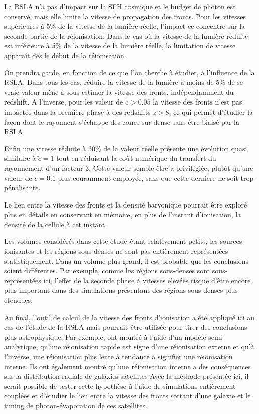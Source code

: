 La \ac{RSLA} n'a pas d'impact sur la \ac{SFH} cosmique et le budget de photon est conservé, mais elle limite la vitesse de propagation des fronts.
Pour les vitesses supérieures à 5\% de la vitesse de la lumière réelle, l'impact ce concentre sur la seconde partie de la réionisation.
Dans le cas où la vitesse de la lumière réduite est inférieure à 5\% de la vitesse de la lumière réelle, la limitation de vitesse apparaît dès le début de la réionisation. %

On prendra garde, en fonction de ce que l'on cherche à étudier, à l'influence de la \ac{RSLA}.
Dans tous les cas, réduire la vitesse de la lumière à moins de 5\% de se vraie valeur mène à sous estimer la vitesse des fronts, indépendamment du redshift.
A l'inverse, pour les valeur de $\tilde{c} > 0.05$ la vitesse des fronts n'est pas impactée dans la première phase à des redshifts $z>8$, ce qui permet d'étudier la façon dont le rayonnent s’échappe des zones sur-dense sans être biaisé par la \ac{RSLA}.

Enfin une vitesse réduite à 30\% de la valeur réelle présente une évolution quasi similaire à $\tilde{c}=1$ tout en réduisant la coût numérique du transfert du rayonnement d'un facteur 3.
Cette valeur semble être à privilégiée, plutôt qu'une valeur de $\tilde{c}=0.1$ plus couramment employée, sans que cette dernière ne soit trop pénalisante.

Le lien entre la vitesse des fronts et la densité baryonique pourrait être exploré plus en détails en conservant en mémoire, en plus de l'instant d'ionisation, la densité de la cellule à cet instant.

Les volumes considérés dans cette étude étant relativement petits, les sources ionisantes et les régions sous-denses ne sont pas entièrement représentées statistiquement.
Dans un volume plus grand, il est probable que les conclusions soient différentes.
Par exemple, comme les régions sous-denses sont sous-représentées ici, l'effet de la seconde phase à vitesses élevées risque d'être encore plus important dans des simulations présentant des régions sous-denses plus étendues.

Au final, l'outil de calcul de la vitesse des fronts d'ionisation a été appliqué ici au cas de l'étude de la \ac{RSLA} mais pourrait être utilisée pour tirer des conclusions plus astrophysique.
Par exemple, \citep{2011MNRAS.417L..93O} ont montré à l'aide d'un modèle semi analytique, qu'une réionisation rapide est signe d'une réionisation externe et qu'à l'inverse, une réionisation plus lente à tendance à signifier une réionisation interne.
Ils ont également montré qu'une réionisation interne a des conséquences sur la distribution radiale de galaxies satellites 
Avec la méthode présentée ici, il serait possible de tester cette hypothèse à l'aide de simulations entièrement couplées et d'étudier le lien entre la vitesse des fronts sortant d'une galaxie et le timing de photon-évaporation de ces satellites.

